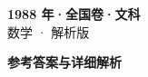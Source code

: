 \documentclass[zihao=-4, a4paper]{ctexart}
\begin{document}
\begin{center}
  {\Large\bfseries 1988 年·全国卷·文科}\\[4pt]
  {\large 数学 · 解析版}
\end{center}
\medskip
{}

\clearpage
{}
\begin{center}{\Large\bfseries 参考答案与详细解析}\end{center}
\medskip

\end{document}
